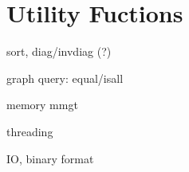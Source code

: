 \section{Utility Fuctions}
\label{sec:utility}

sort, diag/invdiag (?)

graph query: equal/isall

memory mmgt

threading

IO, binary format

